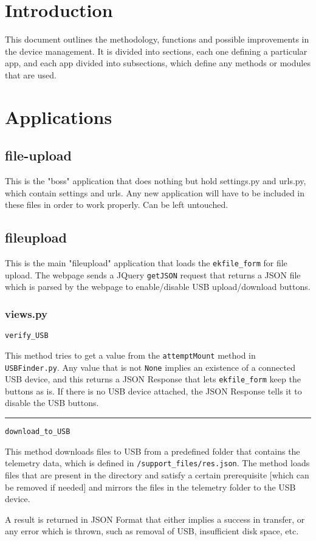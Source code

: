 \documentclass[12pt]{article}
\title{}
\begin{document}
\section{\large{Introduction}}
{\normalsize 
	This document outlines the methodology, functions and possible improvements in the device management. It is divided into sections, each one defining a particular app, and each app divided into subsections, which define any methods or modules that are used.}
	
\section{\large{Applications}}
\subsection{file-upload}
{\normalsize
	This is the "boss" application that does nothing but hold settings.py and urls.py, which contain settings and urls. Any new application will have to be included in these files in order to work properly. Can be left untouched. }
	
\subsection{fileupload}
{\normalsize
	This is the main "fileupload" application that loads the \texttt{ekfile\_form} 
	for file upload. The webpage sends a JQuery \texttt{getJSON} request that returns a JSON file which is parsed by the webpage to enable/disable USB upload/download buttons. }
	
\subsubsection{views.py}
\texttt{verify\_USB}


{\normalsize
	This method tries to get a value from the \texttt {attemptMount} method in \texttt{USBFinder.py}. Any value that is not \texttt{None} implies an existence of a connected USB device, and this returns a JSON Response that lets \texttt{ekfile\_form} keep the buttons as is. If there is no USB device attached, the JSON Response tells it to disable the USB buttons.
}

\noindent\rule[0.5ex]{\linewidth}{0.5pt}
\texttt{download\_to\_USB}

{\normalsize
	This method downloads files to USB from a predefined folder that contains the telemetry data, which is defined in \texttt{/support\_files/res.json}. The method loads files that are present in the directory and satisfy a certain prerequisite [which can be removed if needed] and mirrors the files in the telemetry folder to the USB device.
	
	A result is returned in JSON Format that either implies a success in transfer, or any error which is thrown, such as removal of USB, insufficient disk space, etc. 
}
\end{document}
